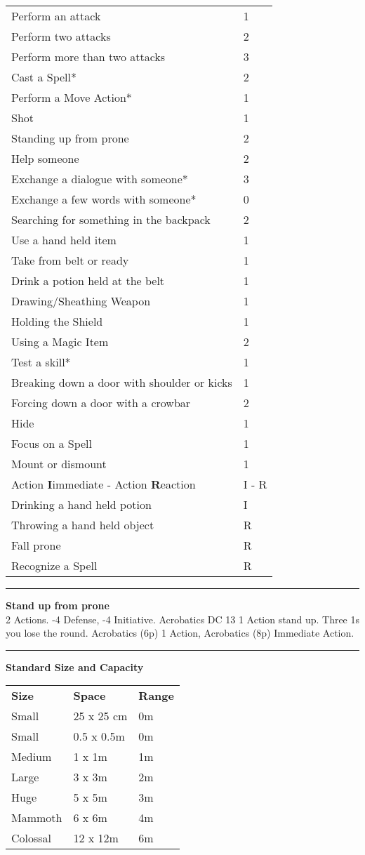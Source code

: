 \documentclass[a4paper,12 pt,openany]{book}
\newcommand{\linex}{\rule{\textwidth}{0.4pt}}
\begin{document}
\begin{textblock*}{8.3cm}
\begin{tabular}{ll}
Perform an attack & 1\\
Perform two attacks & 2\\
Perform more than two attacks & 3\\
Cast a Spell* & 2\\
Perform a Move Action* & 1\\
Shot & 1\\
Standing up from prone & 2\\
Help someone & 2\\
Exchange a dialogue with someone* & 3\\
\small{Exchange a few words with someone*} & 0\\
Searching for something in the backpack & 2\\
Use a hand held item & 1\\
{\small Take from belt or ready} & 1\\
Drink a potion held at the belt & 1\\
Drawing/Sheathing Weapon & 1\\
Holding the Shield & 1\\
Using a Magic Item & 2\\
Test a skill* & 1\\
Breaking down a door with shoulder or kicks&1\\
Forcing down a door with a crowbar &2\\
Hide & 1\\
Focus on a Spell & 1\\
Mount or dismount & 1\\
Action \textbf{I}immediate - Action \textbf{R}eaction & I - R\\
Drinking a hand held potion & I\\
Throwing a hand held object & R\\
Fall prone & R\\
Recognize a Spell & R\\
\end{tabular}

\linex

\textbf{Stand up from prone}\\
2 Actions. -4 Defense, -4 Initiative. Acrobatics DC 13 1 Action stand up. Three 1s you lose the round. Acrobatics (6p) 1 Action, Acrobatics (8p) Immediate Action.

\linex

\textbf{Standard Size and Capacity}\\
\begin{tabular}{lll}
\textbf{Size}& \textbf{Space} &\textbf{Range}\\
Small & 25 x 25 cm&0m\\
Small & 0.5 x 0.5m &0m\\
Medium & 1 x 1m & 1m\\
Large & 3 x 3m & 2m\\
Huge & 5 x 5m &3m\\
Mammoth & 6 x 6m&4m\\
Colossal & 12 x 12m&6m\\
\end{tabular}


\end{textblock*}
\end{document}
